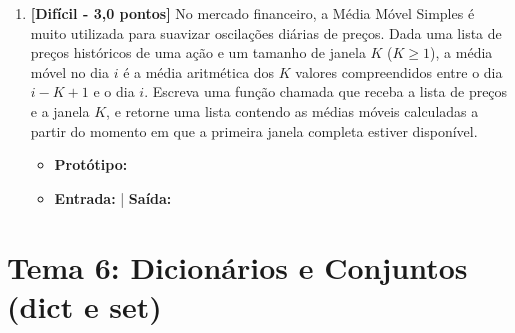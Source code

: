 \begin{enumerate}[label=\textbf{Q\arabic*.}, start=49]


\vspace{0.4cm}

\item \textbf{[Difícil - 3,0 pontos]} No mercado financeiro, a Média Móvel Simples é muito utilizada para suavizar oscilações diárias de preços. Dada uma lista de preços históricos de uma ação e um tamanho de janela $K$ ($K \ge 1$), a média móvel no dia $i$ é a média aritmética dos $K$ valores compreendidos entre o dia $i - K + 1$ e o dia $i$. Escreva uma função chamada  que receba a lista de preços e a janela $K$, e retorne uma lista contendo as médias móveis calculadas a partir do momento em que a primeira janela completa estiver disponível.

\begin{itemize}[leftmargin=*]
    \item \textbf{Protótipo:}\newline {}\\
    \item \textbf{Entrada:}  | \textbf{Saída:} \code{[102.0, 104.0, 106.0]}
\end{itemize}



\vspace{0.4cm}

\end{enumerate}


\section*{Tema 6: Dicionários e Conjuntos (dict e set)}

